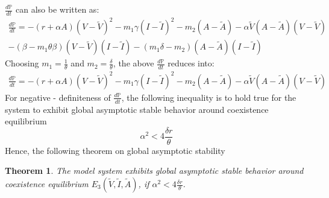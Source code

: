 \documentclass[12pt,a4wide]{report}
\newtheorem{theorem}{Theorem}[section]
\numberwithin{equation}{chapter}
\numberwithin{theorem}{chapter}
\begin{document}
$\frac{d \mathbb P}{dt}$ can also be written as:
\begin{equation}\label{sec3:e41}
\begin{split}
\frac{d\mathbb P}{dt} = -(r+\alpha A)(V-\tilde V)^2 - m_1\gamma(I-\tilde I)^2-m_2(A-\tilde A)-\alpha \tilde V(A-\tilde A)(V-\tilde V)\\ - (\beta-m_1\theta\beta)(V-\tilde V)(I-\tilde I) - (m_1\delta-m_2)(A-\tilde A)(I-\tilde I)
\end{split}
\end{equation}
Choosing $m_1 = \frac{1}{\theta}$ and $m_2 = \frac{\delta}{\theta}$, the above $\frac{d \mathbb P}{dt}$ reduces into:
\begin{equation}\label{sec3:e42}
\begin{split}
\frac{d\mathbb P}{dt} = -(r+\alpha A)(V-\tilde V)^2 - m_1\gamma(I-\tilde I)^2 - m_2(A-\tilde A)-\alpha \tilde V(A-\tilde A)(V-\tilde V)
\end{split}
\end{equation}
For negative - definiteness of $\frac{d \mathbb P}{dt}$, the following inequality is to hold true for the system to exhibit global asymptotic stable behavior around coexistence equilibrium
\begin{equation}
\alpha^2<4\frac{\delta r}{\theta}  
\end{equation}
Hence, the following theorem on global asymptotic stability
\begin{theorem}\label{Theorem 3.5}
The model system exhibits global asymptotic stable behavior around coexistence equilibrium $E_3(\tilde V,\tilde I,\tilde A)$, if $\alpha^2<4\frac{\delta r}{\theta}$.
\end{theorem}
\end{document}
